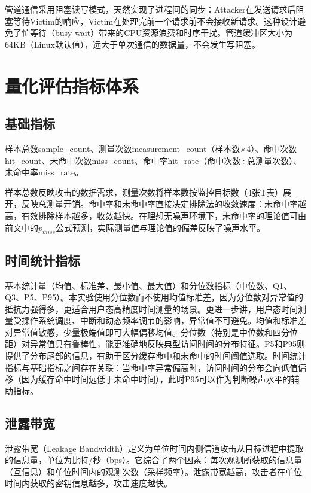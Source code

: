 管道通信采用阻塞读写模式，天然实现了进程间的同步：Attacker在发送请求后阻塞等待Victim的响应，Victim在处理完前一个请求前不会接收新请求。这种设计避免了忙等待（busy-wait）带来的CPU资源浪费和时序干扰。管道缓冲区大小为64KB（Linux默认值），远大于单次通信的数据量，不会发生写阻塞。

\section{量化评估指标体系}

\subsection{基础指标}

样本总数sample\_count、测量次数measurement\_count（样本数×4）、命中次数hit\_count、未命中次数miss\_count、命中率hit\_rate（命中次数÷总测量次数）、未命中率miss\_rate。

样本总数反映攻击的数据需求，测量次数将样本数按监控目标数（4张T表）展开，反映总测量开销。命中率和未命中率直接决定排除法的收敛速度：未命中率越高，有效排除样本越多，收敛越快。在理想无噪声环境下，未命中率的理论值可由前文中的$p_{miss}$公式预测，实际测量值与理论值的偏差反映了噪声水平。

\subsection{时间统计指标}

基本统计量（均值、标准差、最小值、最大值）和分位数指标（中位数、Q1、Q3、P5、P95）。本实验使用分位数而不使用均值标准差，因为分位数对异常值的抵抗力强得多，更适合用户态高精度时间测量的场景。更进一步讲，用户态时间测量受操作系统调度、中断和动态频率调节的影响，异常值不可避免。均值和标准差对异常值敏感，少量极端值即可大幅偏移均值。分位数（特别是中位数和四分位距）对异常值具有鲁棒性，能更准确地反映典型访问时间的分布特征。P5和P95则提供了分布尾部的信息，有助于区分缓存命中和未命中的时间阈值选取。时间统计指标与基础指标之间存在关联：当命中率异常偏高时，访问时间的分布会向低值偏移（因为缓存命中时间远低于未命中时间），此时P95可以作为判断噪声水平的辅助指标。

\subsection{泄露带宽}

泄露带宽（Leakage Bandwidth）定义为单位时间内侧信道攻击从目标进程中提取的信息量，单位为比特/秒（bps）。它综合了两个因素：每次观测所获取的信息量（互信息）和单位时间内的观测次数（采样频率）。泄露带宽越高，攻击者在单位时间内获取的密钥信息越多，攻击速度越快。

